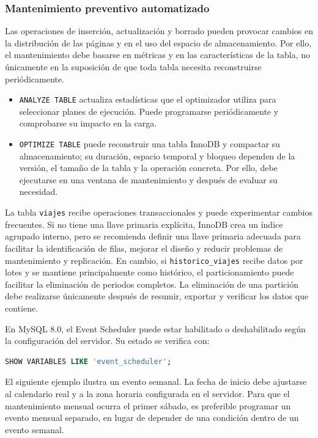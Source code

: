 \documentclass[10pt,a4paper]{article}
\begin{document}
\newpage

\subsubsection{Mantenimiento preventivo automatizado}

Las operaciones de inserción, actualización y borrado pueden provocar cambios en la distribución de las páginas y en el uso del espacio de almacenamiento. Por ello, el mantenimiento debe basarse en métricas y en las características de la tabla, no únicamente en la suposición de que toda tabla necesita reconstruirse periódicamente.

\begin{itemize}
    \item \texttt{ANALYZE TABLE} actualiza estadísticas que el optimizador utiliza para seleccionar planes de ejecución. Puede programarse periódicamente y comprobarse su impacto en la carga.
    \item \texttt{OPTIMIZE TABLE} puede reconstruir una tabla InnoDB y compactar su almacenamiento; su duración, espacio temporal y bloqueo dependen de la versión, el tamaño de la tabla y la operación concreta. Por ello, debe ejecutarse en una ventana de mantenimiento y después de evaluar su necesidad.
\end{itemize}

La tabla \texttt{viajes} recibe operaciones transaccionales y puede experimentar cambios frecuentes. Si no tiene una llave primaria explícita, InnoDB crea un índice agrupado interno, pero se recomienda definir una llave primaria adecuada para facilitar la identificación de filas, mejorar el diseño y reducir problemas de mantenimiento y replicación. En cambio, si \texttt{historico\_viajes} recibe datos por lotes y se mantiene principalmente como histórico, el particionamiento puede facilitar la eliminación de periodos completos. La eliminación de una partición debe realizarse únicamente después de resumir, exportar y verificar los datos que contiene.

En MySQL 8.0, el Event Scheduler puede estar habilitado o deshabilitado según la configuración del servidor. Su estado se verifica con:

\begin{lstlisting}[language=SQL, caption={Verificación del Event Scheduler}]
SHOW VARIABLES LIKE 'event_scheduler';
\end{lstlisting}

El siguiente ejemplo ilustra un evento semanal. La fecha de inicio debe ajustarse al calendario real y a la zona horaria configurada en el servidor. Para que el mantenimiento mensual ocurra el primer sábado, es preferible programar un evento mensual separado, en lugar de depender de una condición dentro de un evento semanal.
\end{document}
